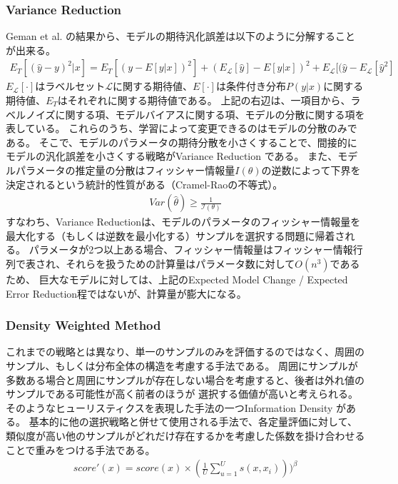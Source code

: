 \subsubsection{Variance Reduction \cite{cohn1994improving}}
Geman et al. \cite{geman2008neural}の結果から、モデルの期待汎化誤差は以下のように分解することが出来る。
\begin{eqnarray}
    E_T [(\hat{y} - y)^2|x] = E_T [(y - E[y|x])^2] + (E_{\mathcal{L}}[\hat{y}] - E[y|x])^2 + E_{\mathcal{L}} [(\hat{y} - E_{\mathcal{L}}[\hat{y}^2]
\end{eqnarray}
$E_{\mathcal{L}}[\cdot]$はラベルセット$\mathcal{L}$に関する期待値、$E[\cdot]$は条件付き分布$P(y|x)$に関する期待値、$E_T$はそれぞれに関する期待値である。
上記の右辺は、一項目から、ラベルノイズに関する項、モデルバイアスに関する項、モデルの分散に関する項を表している。
これらのうち、学習によって変更できるのはモデルの分散のみである。
そこで、モデルのパラメータの期待分散を小さくすることで、間接的にモデルの汎化誤差を小さくする戦略がVariance Reduction \cite{cohn1994improving}である。
また、モデルパラメータの推定量の分散はフィッシャー情報量$I(\theta)$の逆数によって下界を決定されるという統計的性質がある（Cramel-Raoの不等式）。
\begin{eqnarray}
    Var(\hat{\theta}) \geq \frac{1}{\mathcal{I(\theta)}}
\end{eqnarray}
すなわち、Variance Reductionは、モデルのパラメータのフィッシャー情報量を最大化する（もしくは逆数を最小化する）サンプルを選択する問題に帰着される。
パラメータが2つ以上ある場合、フィッシャー情報量はフィッシャー情報行列で表され、それらを扱うための計算量はパラメータ数に対して$O(n^3)$であるため、
巨大なモデルに対しては、上記のExpected Model Change / Expected Error Reduction程ではないが、計算量が膨大になる。

\subsubsection{Density Weighted Method}
これまでの戦略とは異なり、単一のサンプルのみを評価するのではなく、周囲のサンプル、もしくは分布全体の構造を考慮する手法である。
周囲にサンプルが多数ある場合と周囲にサンプルが存在しない場合を考慮すると、後者は外れ値のサンプルである可能性が高く前者のほうが
選択する価値が高いと考えられる。
そのようなヒューリスティクスを表現した手法の一つInformation Density \cite{settles2008analysis}がある。
基本的に他の選択戦略と併せて使用される手法で、各定量評価に対して、類似度が高い他のサンプルがどれだけ存在するかを考慮した係数を掛け合わせることで重みをつける手法である。
\begin{eqnarray}
    score'(x) = score(x) \times (\frac{1}{U} \sum_{u=1}^{U} s(x, x_i)))^{\beta}
\end{eqnarray}

